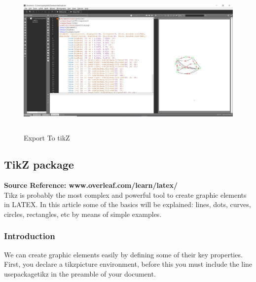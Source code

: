 \documentclass[a4paper,10pt]{article}
\begin{document}
\paragraph{}
\begin{figure}[H]
		\centering
		\includegraphics[height = 3in]{tikzFunc2.png}
		\caption[Optional caption]{Export To tikZ}
		\label{fig:Repository}
	\end{figure}
\paragraph{}
\subsection{TikZ package} 
\textbf{Source Reference: www.overleaf.com/learn/latex/} \\
Tikz is probably the most complex and powerful tool to create graphic elements in LATEX. In this article some of the basics will be explained: lines, dots, curves, circles, rectangles, etc by means of simple examples.

\subsubsection{Introduction}
We can create graphic elements easily by defining some of their key properties.
First, you declare a tikzpicture environment, before this you must include the line  usepackage{tikz} in the preamble of your document.
\end{document}
